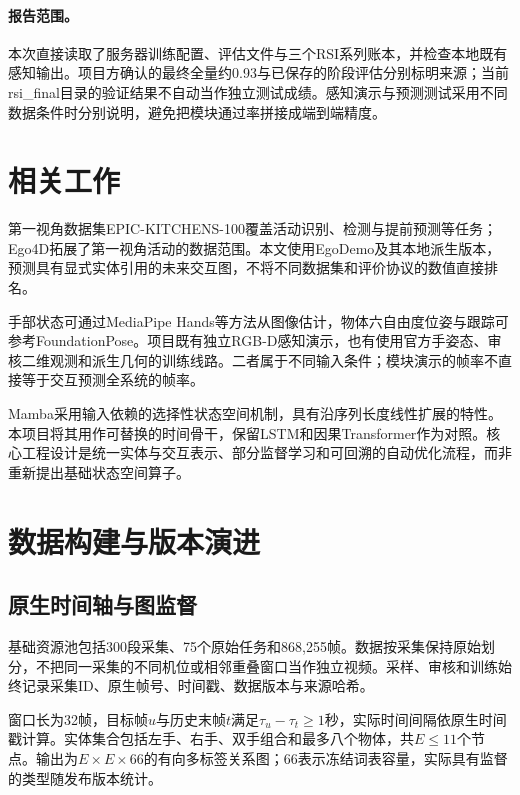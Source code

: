 \documentclass[10pt,twocolumn,letterpaper]{article}
\begin{document}
\paragraph{报告范围。}
本次直接读取了服务器训练配置、评估文件与三个RSI系列账本，并检查本地既有感知输出。项目方确认的最终全量约0.93与已保存的阶段评估分别标明来源；当前rsi\_final目录的验证结果不自动当作独立测试成绩。感知演示与预测测试采用不同数据条件时分别说明，避免把模块通过率拼接成端到端精度。

\section{相关工作}
第一视角数据集EPIC-KITCHENS-100覆盖活动识别、检测与提前预测等任务\cite{damen2022rescaling}；Ego4D拓展了第一视角活动的数据范围\cite{grauman2022ego4d}。本文使用EgoDemo及其本地派生版本\cite{egodemo}，预测具有显式实体引用的未来交互图，不将不同数据集和评价协议的数值直接排名。

手部状态可通过MediaPipe Hands等方法从图像估计\cite{zhang2020mediapipe}，物体六自由度位姿与跟踪可参考FoundationPose\cite{wen2024foundationpose}。项目既有独立RGB-D感知演示，也有使用官方手姿态、审核二维观测和派生几何的训练线路。二者属于不同输入条件；模块演示的帧率不直接等于交互预测全系统的帧率。

Mamba采用输入依赖的选择性状态空间机制，具有沿序列长度线性扩展的特性\cite{gu2023mamba}。本项目将其用作可替换的时间骨干，保留LSTM和因果Transformer作为对照。核心工程设计是统一实体与交互表示、部分监督学习和可回溯的自动优化流程，而非重新提出基础状态空间算子。



\section{数据构建与版本演进}
\subsection{原生时间轴与图监督}
基础资源池包括300段采集、75个原始任务和868,255帧。数据按采集保持原始划分，不把同一采集的不同机位或相邻重叠窗口当作独立视频。采样、审核和训练始终记录采集ID、原生帧号、时间戳、数据版本与来源哈希。

窗口长为32帧，目标帧$u$与历史末帧$t$满足$\tau_u-\tau_t\geq1$秒，实际时间间隔依原生时间戳计算。实体集合包括左手、右手、双手组合和最多八个物体，共$E\leq11$个节点。输出为$E\times E\times66$的有向多标签关系图；66表示冻结词表容量，实际具有监督的类型随发布版本统计。
\end{document}
